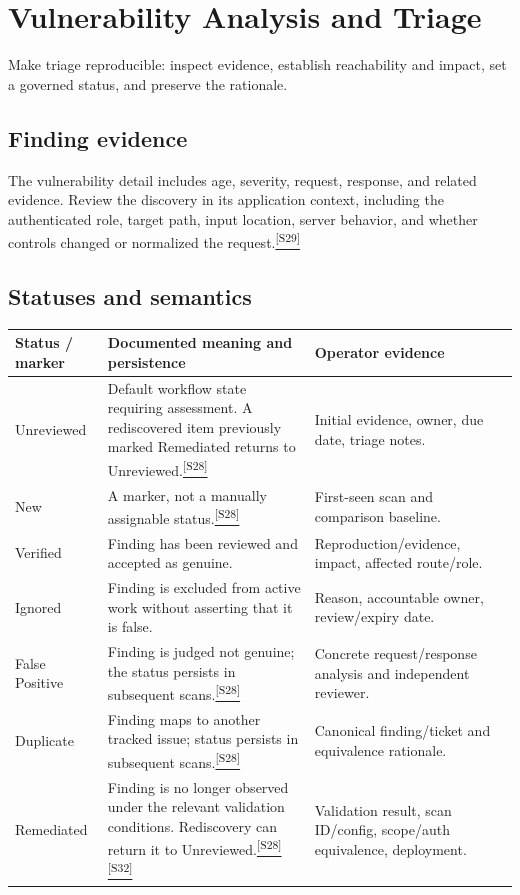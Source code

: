 \documentclass[11pt,letterpaper,oneside]{scrreprt}
\newcommand{\src}[1]{\hyperref[src:#1]{\textsuperscript{\color{R7Orange}[#1]}}}
\newcommand{\chapterlead}[1]{\begin{tcolorbox}[enhanced,colback=R7Light,colframe=R7Light,boxrule=0pt,borderline west={3pt}{0pt}{R7Orange},arc=0pt,left=9pt,right=9pt,top=7pt,bottom=7pt]#1\end{tcolorbox}}
\begin{document}
\chapter{Vulnerability Analysis and Triage}
\chapterlead{Make triage reproducible: inspect evidence, establish reachability and impact, set a governed status, and preserve the rationale.}

\section{Finding evidence}
The vulnerability detail includes age, severity, request, response, and related evidence. Review the discovery in its application context, including the authenticated role, target path, input location, server behavior, and whether controls changed or normalized the request.\src{S29}

\section{Statuses and semantics}
\begin{tabularx}{\textwidth}{@{}P{1.25in}Y P{2.15in}@{}}
\toprule
\textbf{Status / marker} & \textbf{Documented meaning and persistence} & \textbf{Operator evidence}\\
\midrule
Unreviewed & Default workflow state requiring assessment. A rediscovered item previously marked Remediated returns to Unreviewed.\src{S28} & Initial evidence, owner, due date, triage notes.\\
New & A marker, not a manually assignable status.\src{S28} & First-seen scan and comparison baseline.\\
Verified & Finding has been reviewed and accepted as genuine. & Reproduction/evidence, impact, affected route/role.\\
Ignored & Finding is excluded from active work without asserting that it is false. & Reason, accountable owner, review/expiry date.\\
False Positive & Finding is judged not genuine; the status persists in subsequent scans.\src{S28} & Concrete request/response analysis and independent reviewer.\\
Duplicate & Finding maps to another tracked issue; status persists in subsequent scans.\src{S28} & Canonical finding/ticket and equivalence rationale.\\
Remediated & Finding is no longer observed under the relevant validation conditions. Rediscovery can return it to Unreviewed.\src{S28}\src{S32} & Validation result, scan ID/config, scope/auth equivalence, deployment.\\
\bottomrule
\end{tabularx}
\end{document}
